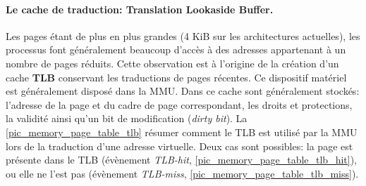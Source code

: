 \paragraph{Le cache de traduction: Translation Lookaside Buffer.} \label{sec:tlb}
Les pages étant de plus en plus grandes (4 KiB sur les architectures actuelles), les processus font généralement beaucoup d'accès à des adresses appartenant à un nombre de pages réduits. Cette observation est à l'origine de la création d'un cache \textbf{TLB} conservant les traductions de pages récentes. Ce dispositif matériel est généralement disposé dans la MMU. Dans ce cache sont généralement stockés: l'adresse de la page et du cadre de  page correspondant, les droits et protections, la validité ainsi qu'un bit de modification (\textit{dirty bit}). 
La \autoref{pic_memory_page_table_tlb} résumer comment le TLB est utilisé par la MMU lors de la traduction d'une adresse virtuelle. Deux cas sont possibles: la page est présente dans le TLB (évènement \textit{TLB-hit}, \autoref{pic_memory_page_table_tlb_hit}), ou elle ne l'est pas (évènement \textit{TLB-miss}, \autoref{pic_memory_page_table_tlb_miss}).


